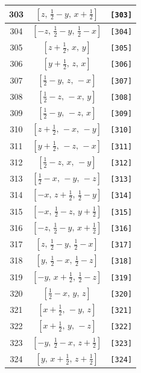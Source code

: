 \documentclass[fleqn,8pt]{jsarticle}
\begin{document}
\begin{longtable}{ccc}
303 & $\left[ z,\, \frac{1}{2} - y,\, x + \frac{1}{2} \right]$ & {\tt [303]} \\ \hline
304 & $\left[ - z,\, \frac{1}{2} - y,\, \frac{1}{2} - x \right]$ & {\tt [304]} \\ \hline
305 & $\left[ z + \frac{1}{2},\, x,\, y \right]$ & {\tt [305]} \\ \hline
306 & $\left[ y + \frac{1}{2},\, z,\, x \right]$ & {\tt [306]} \\ \hline
307 & $\left[ \frac{1}{2} - y,\, z,\, - x \right]$ & {\tt [307]} \\ \hline
308 & $\left[ \frac{1}{2} - z,\, - x,\, y \right]$ & {\tt [308]} \\ \hline
309 & $\left[ \frac{1}{2} - y,\, - z,\, x \right]$ & {\tt [309]} \\ \hline
310 & $\left[ z + \frac{1}{2},\, - x,\, - y \right]$ & {\tt [310]} \\ \hline
311 & $\left[ y + \frac{1}{2},\, - z,\, - x \right]$ & {\tt [311]} \\ \hline
312 & $\left[ \frac{1}{2} - z,\, x,\, - y \right]$ & {\tt [312]} \\ \hline
313 & $\left[ \frac{1}{2} - x,\, - y,\, - z \right]$ & {\tt [313]} \\ \hline
314 & $\left[ - x,\, z + \frac{1}{2},\, \frac{1}{2} - y \right]$ & {\tt [314]} \\ \hline
315 & $\left[ - x,\, \frac{1}{2} - z,\, y + \frac{1}{2} \right]$ & {\tt [315]} \\ \hline
316 & $\left[ - z,\, \frac{1}{2} - y,\, x + \frac{1}{2} \right]$ & {\tt [316]} \\ \hline
317 & $\left[ z,\, \frac{1}{2} - y,\, \frac{1}{2} - x \right]$ & {\tt [317]} \\ \hline
318 & $\left[ y,\, \frac{1}{2} - x,\, \frac{1}{2} - z \right]$ & {\tt [318]} \\ \hline
319 & $\left[ - y,\, x + \frac{1}{2},\, \frac{1}{2} - z \right]$ & {\tt [319]} \\ \hline
320 & $\left[ \frac{1}{2} - x,\, y,\, z \right]$ & {\tt [320]} \\ \hline
321 & $\left[ x + \frac{1}{2},\, - y,\, z \right]$ & {\tt [321]} \\ \hline
322 & $\left[ x + \frac{1}{2},\, y,\, - z \right]$ & {\tt [322]} \\ \hline
323 & $\left[ - y,\, \frac{1}{2} - x,\, z + \frac{1}{2} \right]$ & {\tt [323]} \\ \hline
324 & $\left[ y,\, x + \frac{1}{2},\, z + \frac{1}{2} \right]$ & {\tt [324]} \\ \hline

\end{longtable}
\end{document}
